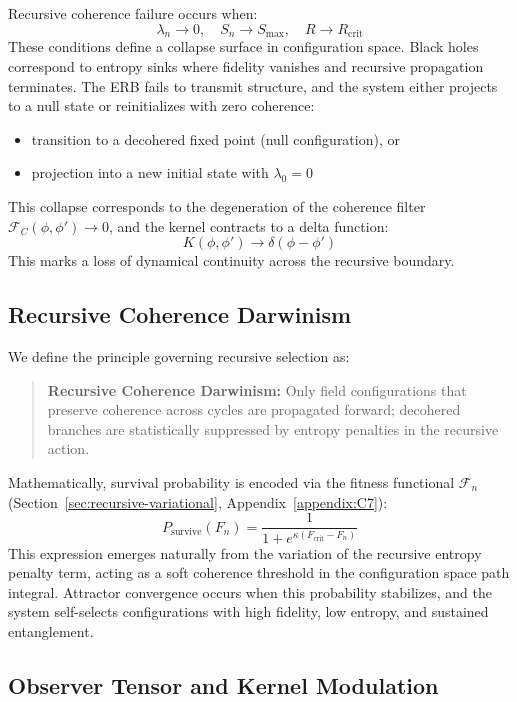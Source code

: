 Recursive coherence failure occurs when:
\[
\lambda_n \to 0, \quad S_n \to S_{\text{max}}, \quad R \to R_{\text{crit}}
\]
These conditions define a collapse surface in configuration space. Black holes correspond to entropy sinks where fidelity vanishes and recursive propagation terminates. The ERB fails to transmit structure, and the system either projects to a null state or reinitializes with zero coherence:
\begin{itemize}
    \item transition to a decohered fixed point (null configuration), or
    \item projection into a new initial state with \( \lambda_0 = 0 \)
\end{itemize}
This collapse corresponds to the degeneration of the coherence filter \( \mathcal{F}_C(\phi, \phi') \to 0 \), and the kernel contracts to a delta function:
\[
K(\phi, \phi') \to \delta(\phi - \phi')
\]
This marks a loss of dynamical continuity across the recursive boundary.

\subsection{Recursive Coherence Darwinism}

We define the principle governing recursive selection as:
\begin{quote}
\textbf{Recursive Coherence Darwinism:} Only field configurations that preserve coherence across cycles are propagated forward; decohered branches are statistically suppressed by entropy penalties in the recursive action.
\end{quote}

Mathematically, survival probability is encoded via the fitness functional \( \mathcal{F}_n \) (Section~\ref{sec:recursive-variational}, Appendix~\ref{appendix:C7}):
\[
P_{\text{survive}}(F_n) = \frac{1}{1 + e^{\kappa(F_{\text{crit}} - F_n)}}
\]
This expression emerges naturally from the variation of the recursive entropy penalty term, acting as a soft coherence threshold in the configuration space path integral. Attractor convergence occurs when this probability stabilizes, and the system self-selects configurations with high fidelity, low entropy, and sustained entanglement.

\subsection{Observer Tensor and Kernel Modulation}

